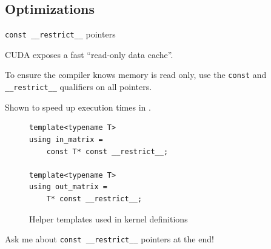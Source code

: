 \subsection{Optimizations}

\begin{frame}[fragile]{\texttt{const \_\_restrict\_\_} pointers}
    
    \begin{minipage}{0.5\textwidth}
        \begin{wideitemize}
        \item CUDA exposes a fast ``read-only data cache''\footnotemark{}.
        \item To ensure the compiler knows memory is read only, use the \texttt{const} and \texttt{\_\_restrict\_\_} qualifiers on all pointers.
        \item Shown to speed up execution times in \parencite{10.1145/3238147.3241533}.
        \end{wideitemize}
    \end{minipage}\hfill%
    \begin{minipage}{0.4\textwidth}
    \begin{figure}[b]
        \centering

        \begin{lstlisting}
template<typename T>
using in_matrix = 
    const T* const __restrict__;

template<typename T>
using out_matrix = 
    T* const __restrict__;\end{lstlisting}
        \caption{Helper templates used in kernel definitions}
    \end{figure}
    \end{minipage}
    
    \vfill\null
    \begin{center}
        Ask me about \texttt{const \_\_restrict\_\_} pointers at the end!
    \end{center}
    
\end{frame}

